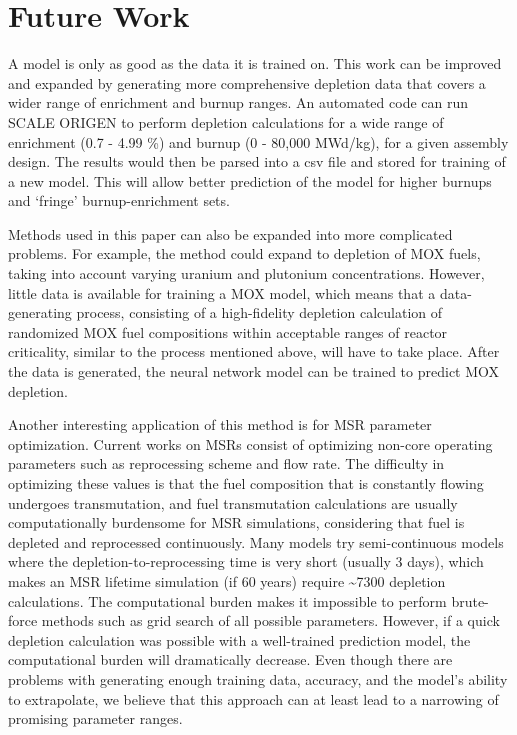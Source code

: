 \section{Future Work}

A model is only as good as the data it is trained on.
This work can be improved and expanded by generating
more comprehensive depletion data that covers a wider
range of enrichment and burnup ranges. An automated
code can run SCALE ORIGEN to perform depletion calculations
for a wide range of enrichment (0.7 - 4.99 \%) and burnup (0 - 80,000 MWd/kg),
for a given assembly design. The results
would then be parsed into a csv file and stored for
training of a new model. This will allow better
prediction of the model for higher burnups and `fringe'
burnup-enrichment sets.

Methods used in this paper can also be expanded into more
complicated problems. For example, the method
could expand to depletion of \gls{MOX} fuels, taking
into account varying uranium and plutonium concentrations.
However, little data is available
for training a \gls{MOX} model, which means that a
data-generating process, consisting of a high-fidelity
depletion calculation of randomized \gls{MOX} fuel
compositions within acceptable ranges of reactor
criticality, similar to the process mentioned above,
will have to take place. After the data
is generated, the neural network model can be trained
to predict \gls{MOX} depletion.

Another interesting application of this method is for
\gls{MSR} parameter optimization. Current works on
\glspl{MSR} consist of optimizing non-core operating
parameters such as reprocessing scheme and flow rate.
The difficulty in optimizing these values is that the
fuel composition that is constantly flowing undergoes
transmutation, and fuel transmutation calculations
are usually computationally burdensome for \gls{MSR}
simulations, considering that fuel is depleted and
reprocessed continuously. Many models try semi-continuous
models where the depletion-to-reprocessing time is
very short (usually 3 days), which makes an
\gls{MSR} lifetime simulation (if 60 years)
require \textasciitilde 7300 depletion calculations.
The computational burden
makes it impossible to perform brute-force methods
such as grid search of all possible parameters.
However, if a quick depletion calculation was possible
with a well-trained prediction model, the
computational burden will dramatically decrease.
Even though there are problems with generating enough
training data, accuracy, and the model's ability to
extrapolate, we believe that this approach can
at least lead to a narrowing of promising parameter
ranges.